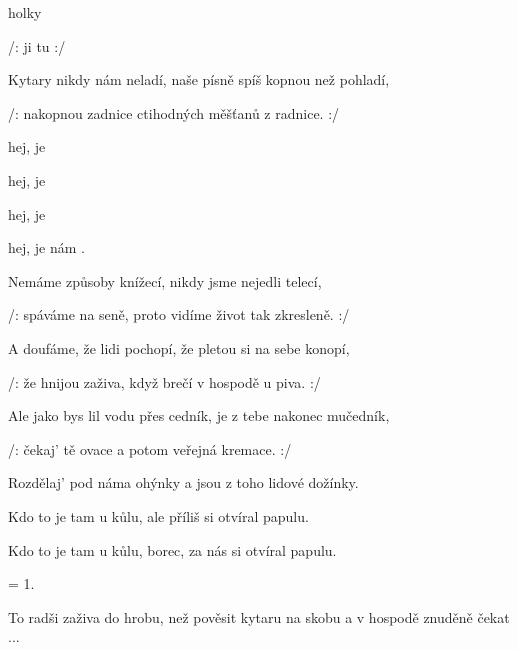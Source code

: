 

\zs
{}  
  holky 

/:  ji 
 tu   :/
\ks

\zs
Kytary nikdy nám neladí,
naše písně spíš kopnou než pohladí,

/: nakopnou zadnice
ctihodných měšťanů z radnice. :/
\ks

\zr
{} hej, je    

 hej, je   

 hej, je   

 hej, je   nám  .
\kr

\zs
Nemáme způsoby knížecí,
nikdy jsme nejedli telecí,

/: spáváme na seně,
proto vidíme život tak zkresleně. :/
\ks

\zs
A doufáme, že lidi pochopí,
že pletou si na sebe konopí,

/: že hnijou zaživa,
když brečí v hospodě u piva. :/
\ks

\zr  \kr

\zs
Ale jako bys lil vodu přes cedník,
je z tebe nakonec mučedník,

/: čekaj' tě ovace
a potom veřejná kremace. :/
\ks

\zs
Rozdělaj' pod náma ohýnky
a jsou z toho lidové dožínky.

Kdo to je tam u kůlu,
ale příliš si otvíral papulu.

Kdo to je tam u kůlu,
borec, za nás si otvíral papulu.
\ks

\zr  \kr

\zs
= 1.
\ks

\zs
To radši zaživa do hrobu,
než pověsit kytaru na skobu
a v hospodě znuděně čekat ...
\ks

